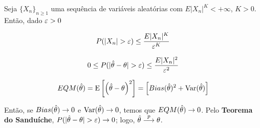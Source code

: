\documentclass[11pt, oneside, a4paper, article]{article}
\numberwithin{equation}{section}
\begin{document}
\begin{description}
\begin{remark}
\end{remark}

\hline
\vspace{1 ex}

\begin{defn}

	Seja
	$\{ X_{n} \}_{n \geq 1}$ 
	uma sequência de variáveis aleatórias com
	$E|X_{n}|^{K} < +\infty$, $K>0$. 
	Então, dado $\varepsilon >0$

	\vspace{-1 em}
	\begin{align*}
		P(| X_{n} | > \varepsilon ) \leq \frac{E|X_{n}|^{K}}{\varepsilon^{K}}
	\end{align*}
\end{defn}

\begin{defn} %

	\begin{align*}
		0 \leq P(| \hat{\theta} - \theta | > \varepsilon ) \leq \frac{E|X_{n}|^{2}}{\varepsilon^{2}}
	\end{align*}
\end{defn}

\begin{defn}

	\begin{align*}
		EQM(\hat{\theta}) 
		=
		\text{E}\left[ \left( \hat{\theta} - \theta \right)^2 \right] 
		=
		\left[ Bias(\hat{\theta})^{2} + \text{Var}(\hat{\theta}) \right]
	\end{align*}
\end{defn}

\begin{remark}

	Então, se $Bias(\hat{\theta}) \to 0$ e $\text{Var}(\hat{\theta}) \to 0$, temos que $EQM(\hat{\theta}) \to 0$.
	Pelo \textbf{Teorema do Sanduíche}, $P(|\hat{\theta} - \theta| > \varepsilon) \to 0$; logo, $\hat{\theta}  \overset{p}{\longrightarrow}  \theta$.
\end{remark}


\end{description}
\end{document}

